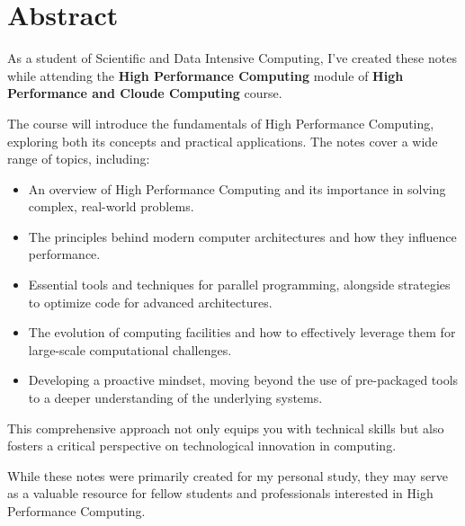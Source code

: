 \chapter*{Abstract}

As a student of Scientific and Data Intensive Computing, I've created these notes while attending the \textbf{High Performance Computing} module of \textbf{High Performance and Cloude Computing} course.

The course will introduce the fundamentals of High Performance Computing, exploring both its concepts and practical applications. The notes cover a wide range of topics, including:

\begin{itemize}
    \item An overview of High Performance Computing and its importance in solving complex, real-world problems.
    \item The principles behind modern computer architectures and how they influence performance.
    \item Essential tools and techniques for parallel programming, alongside strategies to optimize code for advanced architectures.
    \item The evolution of computing facilities and how to effectively leverage them for large-scale computational challenges.
    \item Developing a proactive mindset, moving beyond the use of pre-packaged tools to a deeper understanding of the underlying systems.
\end{itemize}
    
This comprehensive approach not only equips you with technical skills but also fosters a critical perspective on technological innovation in computing.

While these notes were primarily created for my personal study, they may serve as a valuable resource for fellow students and professionals interested in High Performance Computing.
